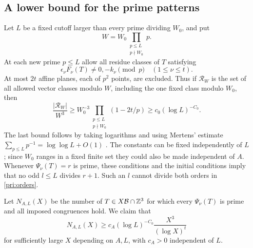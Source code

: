 \subsection{A lower bound for the prime patterns}

Let $L$ be a fixed cutoff larger than every prime dividing $W_0$, and put
\[
                    W=W_0\prod_{\substack{p\le L\\p\nmid W_0}}p.
\]
At each new prime $p\le L$ allow all residue classes of $T$ satisfying
\begin{equation}\label{pri:small-exclusions}
                   \epsilon_\nu F_\nu(T)\ne0,-k_\nu\pmod p
                         \quad(1\le\nu\le t).
\end{equation}
At most $2t$ affine planes, each of $p^2$ points, are excluded.  Thus if
$\mathcal R_W$ is the set of all allowed vector classes modulo $W$,
including the one fixed class modulo $W_0$, then
\begin{equation}\label{pri:crt-density}
 \frac{|\mathcal R_W|}{W^3}
 \ge W_0^{-3}\prod_{\substack{p\le L\\p\nmid W_0}}(1-2t/p)
 \ge c_0(\log L)^{-C_0}.
\end{equation}
The last bound follows by taking logarithms and using Mertens' estimate
$\sum_{p\le L}p^{-1}=\log\log L+O(1)$
\cite[equation~(1.1) and Theorem~1]{Williams1974}.  The constants can be fixed independently of
$L$; since $W_0$ ranges in a fixed finite set they could also be made
independent of $A$.  Whenever $\Psi_\nu(T)=r$ is prime, these conditions
and the initial conditions imply that no odd $l\le L$ divides $r+1$.
Such an $l$ cannot divide both orders in \eqref{pri:orders}.

Let $N_{A,L}(X)$ be the number of $T\in X\mathcal B\cap\mathbb Z^3$ for which
every $\Psi_\nu(T)$ is prime and all imposed congruences hold. We claim
that
\begin{equation}\label{pri:lower}
                  N_{A,L}(X)\ge
        c_A(\log L)^{-C_0}\frac{X^3}{(\log X)^t}
\end{equation}
for sufficiently large $X$ depending on $A,L$, with $c_A>0$ independent
of $L$.

